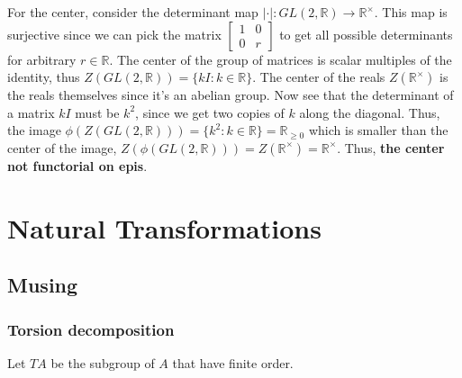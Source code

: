 \documentclass[11pt]{report}
\begin{document}
For the center, consider the determinant map $|\cdot|: GL(2, \mathbb R) \rightarrow \mathbb R^\times$.
This map is surjective since we can pick the matrix $\begin{bmatrix} 1 & 0 \\ 0 & r \end{bmatrix}$ to get all possible
determinants  for arbitrary $r \in \mathbb R$. The center
of the group of matrices is scalar multiples of the identity, thus $Z(GL(2, \mathbb R)) = \{ k I : k \in \mathbb R \}$.
The center of the reals $Z(\mathbb R^\times)$ is the reals themselves since it's an abelian group. Now see
that the determinant of a matrix $kI$ must be $k^2$, since we get two copies of $k$ along the diagonal. Thus, the image
$\phi(Z(GL(2, \mathbb R))) = \{ k^2 : k \in \mathbb R \} = \mathbb R_{\geq 0}$ which is smaller than the center of the image,
$Z(\phi(GL(2, \mathbb R))) = Z(\mathbb R^{\times}) = \mathbb R^\times$. Thus, \textbf{the center not functorial on epis}.

\section{Natural Transformations}

\subsection{Musing}
\subsubsection{Torsion decomposition}

Let $TA$ be the subgroup of $A$ that have finite order.
\end{document}
